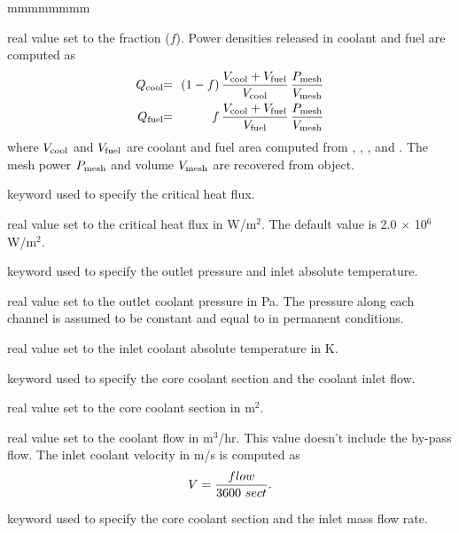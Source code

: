 \begin{ListeDeDescription}{mmmmmmmm}
\item[\dusa{fract}] real value set to the fraction ($f$). Power densities released in coolant and
fuel are computed as
\begin{eqnarray*}
Q_{\rm cool} \negthinspace\negthinspace &=& \negthinspace\negthinspace (1-f)\, {V_{\rm cool}+V_{\rm fuel} \over V_{\rm cool}} \, {P_{\rm mesh} \over
V_{\rm mesh}} \\
Q_{\rm fuel} \negthinspace\negthinspace &=& \negthinspace\negthinspace f\, {V_{\rm cool}+V_{\rm fuel} \over V_{\rm fuel}} \, {P_{\rm mesh} \over
V_{\rm mesh}}
\end{eqnarray*}
\noindent where $V_{\rm cool}$ and $V_{\rm fuel}$ are coolant and fuel area computed from
, , ,  and . The mesh power $P_{\rm mesh}$ and
volume $V_{\rm mesh}$ are recovered from  object.

\item[\moc{CRITFL}] keyword used to specify the critical heat flux.

\item[\dusa{cflux}] real value set to the critical heat flux in W/m$^2$. The default value is 2.0
$\times$ 10$^6$ W/m$^2$.

\item[\moc{INLET}] keyword used to specify the outlet pressure and inlet absolute temperature.

\item[\dusa{poutlet}] real value set to the outlet coolant pressure in Pa. The pressure along each channel is assumed to be
constant and equal to  in permanent conditions.

\item[\dusa{tinlet}] real value set to the inlet coolant absolute temperature in K.

\item[\moc{CWSECT}] keyword used to specify the core coolant section and the coolant inlet flow.

\item[\dusa{sect}] real value set to the core coolant section in m$^2$.

\item[\dusa{flow}] real value set to the coolant flow in m$^3$/hr. This value doesn't include the by-pass flow.
The inlet coolant velocity in m/s is computed as $$V={{\sl flow} \over 3600 \ {\sl sect}}.$$

\item[\moc{INLET-Q}] keyword used to specify the core coolant section and the inlet mass flow rate.


\end{ListeDeDescription}
